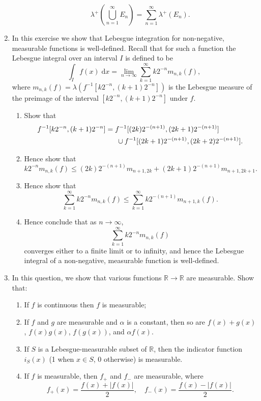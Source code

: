 \documentclass{article}
\newcommand{\diff}{\;\mathrm{d}}
\begin{document}
\begin{enumerate}
\begin{enumerate}
				\[\lambda^+\left(\bigcup_{n=1}^\infty E_n\right) = \sum_{n=1}^\infty \lambda^+(E_n).\]
		\end{enumerate}
	\item In this exercise we show that Lebesgue integration for non-negative, measurable functions is well-defined. Recall that for such a function the Lebesgue integral over an interval $I$ is defined to be
		\[\int_If(x)\diff x =\lim_{n\to \infty} \sum_{k=1}^\infty k2^{-n}m_{n,k}(f),\]
		where $m_{n,k}(f)=\lambda\left(f^{-1}[k2^{-n},(k+1)2^{-n}]\right)$ is the Lebesgue measure of the preimage of the interval $[k2^{-n},(k+1)2^{-n}]$ under $f$.
		\begin{enumerate}
			\item Show that
				\begin{align*}
					f^{-1}[k2^{-n},(k+1)2^{-n}]&=f^{-1}[(2k)2^{-(n+1)},(2k+1)2^{-(n+1)}]\\
					&{\color{white} = =}\cup f^{-1}[(2k+1)2^{-(n+1)},(2k+2)2^{-(n+1)}].
				\end{align*}
			\item Hence show that
				\[k2^{-n}m_{n,k}(f)\leq (2k)2^{-(n+1)}m_{n+1,2k}+(2k+1)2^{-(n+1)}m_{n+1,2k+1}.\]
			\item Hence show that
				\[\sum_{k=1}^\infty k2^{-n}m_{n,k}(f)\leq \sum_{k=1}^\infty k2^{-(n+1)}m_{n+1,k}(f).\]
			\item Hence conclude that as $n\to\infty$, 
				\[\sum_{k=1}^\infty k2^{-n}m_{n,k}(f)\]
				converges either to a finite limit or to infinity, and hence the Lebesgue integral of a non-negative, measurable function is well-defined.
		\end{enumerate}
	\item In this question, we show that various functions $\mathbb{R}\to\mathbb{R}$ are measurable. Show that:
		\begin{enumerate}
			\item If $f$ is continuous then $f$ is measurable;
			\item If $f$ and $g$ are measurable and $\alpha$ is a constant, then so are $f(x)+g(x)$, $f(x)g(x)$, $f(g(x))$, and $\alpha f(x)$.
			\item If $S$ is a Lebesgue-measurable subset of $\mathbb{R}$, then the indicator function $i_S(x)$ (1 when $x\in S$, 0 otherwise) is measurable.
			\item If $f$ is measurable, then $f_+$ and $f_-$ are measurable, where
				\[f_+(x) = \frac{f(x)+|f(x)|}{2},\quad f_-(x)=\frac{f(x)-|f(x)|}{2}.\]
		\end{enumerate}

\end{enumerate}
\end{document}
